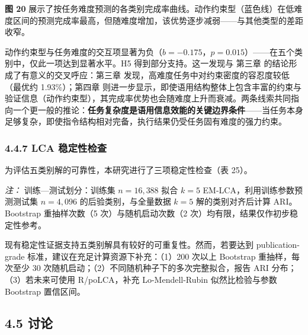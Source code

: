 \documentclass[12pt,a4paper,openany,oneside]{ctexrep}
\begin{document}
\textbf{图 20} 展示了按任务难度预测的各类别完成率曲线。动作约束型（蓝色线）在低难度区间的预测完成率最高，但随难度增加，该优势逐步减弱——与其他类型的差距收窄。

动作约束型与任务难度的交互项显著为负（$b=-0.175$，$p=0.015$）——在五个类别中，仅此一项达到显著水平。H5 得到部分支持。这一发现与 第三章 的结论形成了有意义的交叉呼应：第三章 发现，高难度任务中对约束密度的容忍度较低（最优约 1.93\%）；第四章 则进一步显示，即使语用结构整体上包含丰富的约束与验证信息（动作约束型），其完成率优势也会随难度上升而衰减。两条线索共同指向一个更一般的推论：\textbf{任务复杂度是语用信息效能的关键边界条件}——当任务本身足够复杂，即使指令结构相对完备，执行结果仍受任务固有难度的强力约束。

\subsubsection{4.4.7 LCA 稳定性检查}


为评估五类别解的可靠性，本研究进行了三项稳定性检查（表 25）。


\begin{table}[htbp]
\centering
\caption{表 25：LCA 稳定性检查汇总}
\small
{}
\end{table}

\emph{注：} 训练—测试划分：训练集 $n=16{,}388$ 拟合 $k=5$ EM-LCA，利用训练参数预测测试集 $n=4{,}096$ 的后验类别，与全量数据 $k=5$ 解的类别对齐后计算 ARI。Bootstrap 重抽样次数（5 次）与随机启动次数（2 次）均有限，结果仅作初步稳定性参考。

现有稳定性证据支持五类别解具有较好的可重复性。然而，若要达到 publication-grade 标准，建议在充足计算资源下补充：（1）200 次以上 Bootstrap 重抽样，每次至少 30 次随机启动；（2）不同随机种子下的多次完整拟合，报告 ARI 分布；（3）若未来可使用 R/poLCA，补充 Lo-Mendell-Rubin 似然比检验与参数 Bootstrap 置信区间。

\subsection{4.5 讨论}
\end{document}
